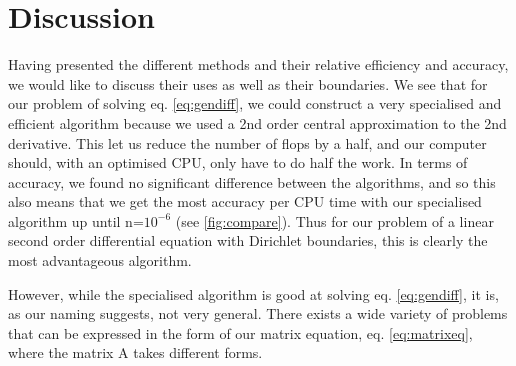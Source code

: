\section{Discussion}
\label{sec:discussion}

Having presented the different methods and their relative efficiency and
accuracy, we would like to discuss their uses as well as their boundaries.
We see that for our problem of solving eq. \ref{eq:gendiff}, we could construct
a very specialised and efficient algorithm because we used a 2nd order
central approximation to the 2nd derivative. This let us reduce the number of
flops by a half, and our computer should, with an optimised CPU, only have to do
half the work. In terms of accuracy, we found no significant difference between
the algorithms, and so this also means that we get the most accuracy per CPU time
with our specialised algorithm up until n=$10^{-6}$ (see \ref{fig:compare}).
Thus for our problem of a linear second order differential equation with
Dirichlet boundaries, this is clearly the most advantageous algorithm.

However, while the specialised algorithm is good at solving eq. \ref{eq:gendiff},
it is, as our naming suggests, not very general. There exists a wide variety of
problems that can be expressed in the form of our matrix equation, eq.
\ref{eq:matrixeq}, where the matrix A takes different forms.
